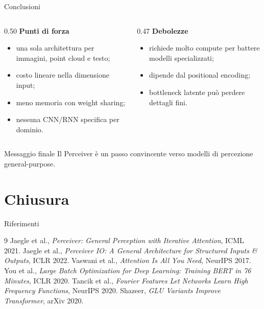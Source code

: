 \documentclass[aspectratio=169,10pt]{beamer}
\begin{document}
\begin{frame}{Conclusioni}
\small
\begin{columns}[T]
\begin{column}{0.50\textwidth}
\textbf{Punti di forza}
\begin{itemize}
  \item una sola architettura per immagini, point cloud e testo;
  \item costo lineare nella dimensione input;
  \item meno memoria con weight sharing;
  \item nessuna CNN/RNN specifica per dominio.
\end{itemize}
\end{column}
\begin{column}{0.47\textwidth}
\textbf{Debolezze}
\begin{itemize}
  \item richiede molto compute per battere modelli specializzati;
  \item dipende dal positional encoding;
  \item bottleneck latente può perdere dettagli fini.
\end{itemize}
\end{column}
\end{columns}

\begin{exampleblock}{Messaggio finale}
Il Perceiver è un passo convincente verso modelli di percezione general-purpose.
\end{exampleblock}
\end{frame}

\section{Chiusura}

\begin{frame}{Riferimenti}
\small
\begin{thebibliography}{9}
 Jaegle et al., \emph{Perceiver: General Perception with Iterative Attention}, ICML 2021.
 Jaegle et al., \emph{Perceiver IO: A General Architecture for Structured Inputs \& Outputs}, ICLR 2022.
 Vaswani et al., \emph{Attention Is All You Need}, NeurIPS 2017.
 You et al., \emph{Large Batch Optimization for Deep Learning: Training BERT in 76 Minutes}, ICLR 2020.
 Tancik et al., \emph{Fourier Features Let Networks Learn High Frequency Functions}, NeurIPS 2020.
 Shazeer, \emph{GLU Variants Improve Transformer}, arXiv 2020.
\end{thebibliography}
\end{frame}
\end{document}
